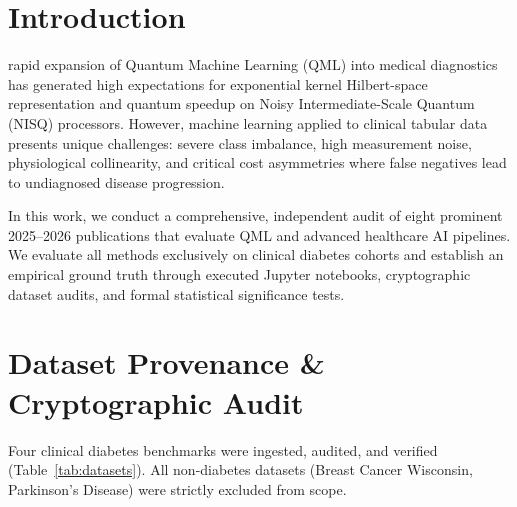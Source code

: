 \documentclass[10pt,journal,compsoc]{IEEEtran}
\begin{document}
\maketitle
\IEEEdisplaynontitleabstractindextext
\IEEEpeerreviewmaketitle

\section{Introduction}
 rapid expansion of Quantum Machine Learning (QML) into medical diagnostics has generated high expectations for exponential kernel Hilbert-space representation and quantum speedup on Noisy Intermediate-Scale Quantum (NISQ) processors. However, machine learning applied to clinical tabular data presents unique challenges: severe class imbalance, high measurement noise, physiological collinearity, and critical cost asymmetries where false negatives lead to undiagnosed disease progression.

In this work, we conduct a comprehensive, independent audit of eight prominent 2025--2026 publications that evaluate QML and advanced healthcare AI pipelines. We evaluate all methods exclusively on clinical diabetes cohorts and establish an empirical ground truth through executed Jupyter notebooks, cryptographic dataset audits, and formal statistical significance tests.

\section{Dataset Provenance \& Cryptographic Audit}
Four clinical diabetes benchmarks were ingested, audited, and verified (Table~\ref{tab:datasets}). All non-diabetes datasets (Breast Cancer Wisconsin, Parkinson's Disease) were strictly excluded from scope.

\begin{table}[htbp]
\caption{Cryptographic Audit of Clinical Diabetes Benchmarks}
\label{tab:datasets}
\centering
{}
\end{table}
\end{document}
